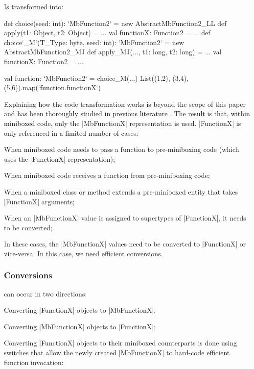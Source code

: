 Is transformed into:

\begin{lstlisting-nobreak}
 def choice(seed: int): `MbFunction2` =
   new AbstractMbFunction2_LL {
     def apply(t1: Object, t2: Object) = ...
     val functionX: Function2 = ...
   }
 def choice`_M`(T_Type: byte, seed: int): `MbFunction2` =
   new AbstractMbFunction2_MJ {
     def apply_MJ(..., t1: long, t2: long) = ...
     val functionX: Function2 = ...
   }

 val function: `MbFunction2` = choice_M(...)
 List((1,2), (3,4), (5,6)).map(`function.functionX`)
\end{lstlisting-nobreak}

Explaining how the code transformation works is beyond the scope of this paper and has been thoroughly studied in previous literature \cite{ldl,ildl-tech}. The result is that, within miniboxed code, only the |MbFunctionX| representation is used. |FunctionX| is only referenced in a limited number of cases:
\begin{compactitem}
  \item When miniboxed code needs to pass a function to pre-miniboxing code (which uses the |FunctionX| representation);
  \item When miniboxed code receives a function from pre-miniboxing code;
  \item When a miniboxed class or method extends a pre-miniboxed entity that takes |FunctionX| arguments;
  \item When an |MbFunctionX| value is assigned to supertypes of |FunctionX|, it needs to be converted;
\end{compactitem}

In these cases, the |MbFunctionX| values need to be converted to |FunctionX| or vice-versa. In this case, we need efficient conversions.

\subsubsection{Conversions} can occur in two directions:
\begin{compactitem}
  \item Converting |FunctionX| objects to |MbFunctionX|;
  \item Converting |MbFunctionX| objects to |FunctionX|;
\end{compactitem}

Converting |FunctionX| objects to their miniboxed counterparts is done using switches that allow the newly created |MbFunctionX| to hard-code efficient function invocation:

